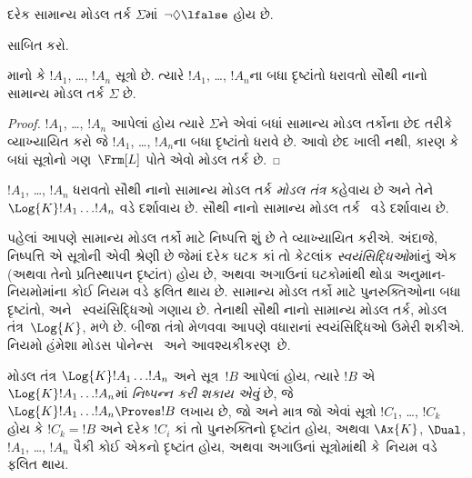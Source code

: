 \begin{prop}
  દરેક સામાન્ય મોડલ તર્ક $\Sigma$માં~$\lnot\Diamond\lfalse$ હોય છે.
\end{prop}

\begin{prob}
   સાબિત કરો.
\end{prob}

\begin{prop}
  માનો કે $!A_1$, \dots, $!A_n$ સૂત્રો છે. ત્યારે $!A_1$,
  \dots, $!A_n$ના બધા દૃષ્ટાંતો ધરાવતો સૌથી નાનો સામાન્ય મોડલ તર્ક
  $\Sigma$ છે.
\end{prop}

\begin{proof}
  $!A_1$, \dots, $!A_n$ આપેલાં હોય ત્યારે $\Sigma$ને એવાં બધાં સામાન્ય
  મોડલ તર્કોના છેદ તરીકે વ્યાખ્યાયિત કરો જે $!A_1$, \dots, $!A_n$ના
  બધા દૃષ્ટાંતો ધરાવે છે. આવો છેદ ખાલી નથી, કારણ કે બધાં સૂત્રોનો
  ગણ~$\Frm[L]$ પોતે એવો મોડલ તર્ક છે.
\end{proof}

\begin{defn}
$!A_1$, \dots, $!A_n$ ધરાવતો સૌથી નાનો સામાન્ય મોડલ તર્ક
\emph{મોડલ તંત્ર} કહેવાય છે અને તેને $\Log{K} !A_1 \dots
!A_n$ વડે દર્શાવાય છે. સૌથી નાનો સામાન્ય મોડલ તર્ક~ વડે
દર્શાવાય છે.
\end{defn}
\endgroup

\begingroup
\makeatletter{}\makeatother


\label{guunit:OLP-0430}


પહેલાં આપણે સામાન્ય મોડલ તર્કો માટે નિષ્પત્તિ શું છે તે
વ્યાખ્યાયિત કરીએ. અંદાજે, નિષ્પત્તિ એ સૂત્રોની એવી શ્રેણી છે
જેમાં દરેક ઘટક કાં તો કેટલાંક \emph{સ્વયંસિદ્ધિઓ}માંનું એક
(અથવા તેનો પ્રતિસ્થાપન દૃષ્ટાંત) હોય છે, અથવા અગાઉનાં ઘટકોમાંથી
થોડા અનુમાન-નિયમોમાંના કોઈ નિયમ વડે ફલિત થાય છે. સામાન્ય મોડલ તર્કો
માટે પુનરુક્તિઓના બધા દૃષ્ટાંતો,  અને~\Dual{}
સ્વયંસિદ્ધિઓ ગણાય છે. તેનાથી સૌથી નાનો સામાન્ય મોડલ તર્ક, મોડલ
તંત્ર~$\Log{K}$, મળે છે. બીજા તંત્રો મેળવવા આપણે વધારાનાં
સ્વયંસિદ્ધિઓ ઉમેરી શકીએ. નિયમો હંમેશા મોડસ પોનેન્સ~\MP{} અને
આવશ્યકીકરણ~\Nec છે.

\begin{defn}
  મોડલ તંત્ર $\Log{K} !A_1 \dots !A_n$ અને સૂત્ર~$!B$ આપેલાં
  હોય, ત્યારે $!B$ એ $\Log{K} !A_1 \dots
  !A_n$માં \emph{નિષ્પન્ન કરી શકાય એવું} છે, જે
  $\Log{K} !A_1 \dots !A_n \Proves !B$ લખાય છે, જો અને માત્ર જો
  એવાં સૂત્રો $!C_1$, \dots, $!C_k$ હોય કે $!C_k = !B$ અને દરેક
  $!C_i$ કાં તો પુનરુક્તિનો દૃષ્ટાંત હોય, અથવા
  $\Ax{K}$, $\Dual$, $!A_1$,
  \dots, $!A_n$ પૈકી કોઈ એકનો દૃષ્ટાંત હોય, અથવા અગાઉનાં
  સૂત્રોમાંથી \MP{} કે~\Nec નિયમ વડે ફલિત થાય.
\end{defn}

